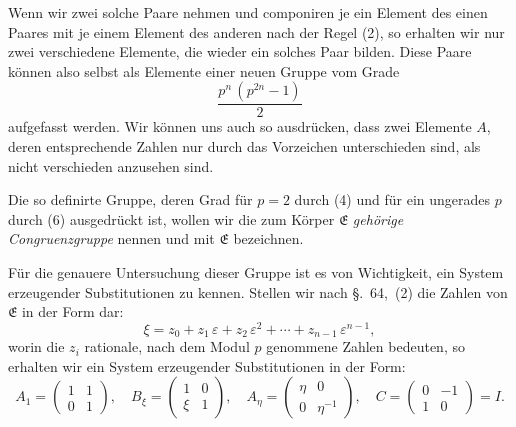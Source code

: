 \documentclass[12pt,a4paper]{article}
\begin{document}
Wenn wir zwei solche Paare nehmen und componiren je ein Element des einen Paares mit je einem Element des anderen nach der Regel (2), so erhalten wir nur zwei verschiedene Elemente, die wieder ein solches Paar bilden. Diese Paare können also selbst als Elemente einer neuen Gruppe vom Grade
\begin{equation}\label{eq:65.6}
\tag{6}
\frac{p^{n}\,(p^{2n} - 1)}{2}
\end{equation}
aufgefasst werden. Wir können uns auch so ausdrücken, dass zwei Elemente $A$, deren entsprechende Zahlen nur durch das Vorzeichen unterschieden sind, als nicht verschieden anzusehen sind.

Die so definirte Gruppe, deren Grad für $p = 2$ durch (4) und für ein ungerades $p$ durch (6) ausgedrückt ist, wollen wir die zum Körper $\mathfrak{E}$ \emph{gehörige Congruenzgruppe} nennen und mit $\mathfrak{E}$ bezeichnen.

Für die genauere Untersuchung dieser Gruppe ist es von Wichtigkeit, ein System erzeugender Substitutionen zu kennen. Stellen wir nach \S.~64,~(2) die Zahlen von $\mathfrak{E}$ in der Form dar:
\begin{equation}\label{eq:65.7}
\tag{7}
\xi = z_{0} + z_{1}\,\varepsilon + z_{2}\,\varepsilon^{2} + \cdots + z_{n-1}\,\varepsilon^{n-1},
\end{equation}
worin die $z_{i}$ rationale, nach dem Modul $p$ genommene Zahlen bedeuten, so erhalten wir ein System erzeugender Substitutionen in der Form:
\begin{equation}\label{eq:65.8}
\tag{8}
A_{1} = \begin{pmatrix}1&1\\0&1\end{pmatrix},\quad
B_{\xi} = \begin{pmatrix}1&0\\\xi&1\end{pmatrix},\quad
A_{\eta} = \begin{pmatrix}\eta&0\\0&\eta^{-1}\end{pmatrix},\quad
C = \begin{pmatrix}0&-1\\1&0\end{pmatrix} = I.
\end{equation}
\end{document}
